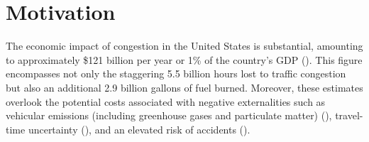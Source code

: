 \chapter{Motivation}
The economic impact of congestion in the United States is substantial, amounting to approximately \$121 billion per year or 1\% of the country's GDP (\cite{schrank2012}). This figure encompasses not only the staggering 5.5 billion hours lost to traffic congestion but also an additional 2.9 billion gallons of fuel burned. Moreover, these estimates overlook the potential costs associated with negative externalities such as vehicular emissions (including greenhouse gases and particulate matter) (\cite{pant2013}), travel-time uncertainty (\cite{carrion2012}), and an elevated risk of accidents (\cite{hennessy1999}).

